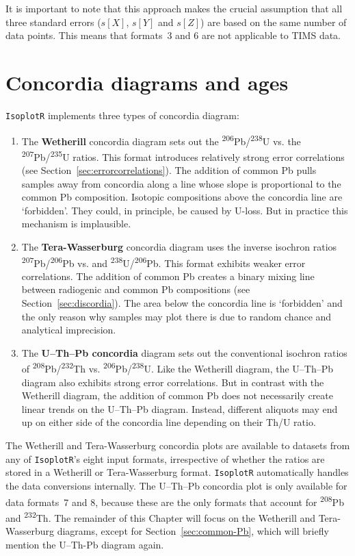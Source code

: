 \begin{refsection}
It is important to note that this approach makes the crucial
assumption that all three standard errors ($s[X]$, $s[Y]$ and $s[Z]$)
are based on the same number of data points. This means that formats~3
and 6 are not applicable to TIMS data.

\section{Concordia diagrams and ages}
\label{sec:concordia}

\texttt{IsoplotR} implements three types of concordia diagram:

\begin{enumerate}
\item The \textbf{Wetherill} concordia diagram sets out the
  \textsuperscript{206}Pb/\textsuperscript{238}U vs. the
  \textsuperscript{207}Pb/\textsuperscript{235}U ratios. This format
  introduces relatively strong error correlations (see
  Section~\ref{sec:errorcorrelations}). The addition of common Pb
  pulls samples away from concordia along a line whose slope is
  proportional to the common Pb composition. Isotopic compositions
  above the concordia line are `forbidden'. They could, in principle,
  be caused by U-loss. But in practice this mechanism is implausible.
\item The \textbf{Tera-Wasserburg} concordia diagram uses the inverse
  isochron ratios \textsuperscript{207}Pb/\textsuperscript{206}Pb vs.
  and \textsuperscript{238}U/\textsuperscript{206}Pb. This format
  exhibits weaker error correlations. The addition of common Pb
  creates a binary mixing line between radiogenic and common Pb
  compositions (see Section~\ref{sec:discordia}). The area below the
  concordia line is `forbidden' and the only reason why samples may
  plot there is due to random chance and analytical imprecision.
\item The \textbf{U--Th--Pb concordia} diagram sets out the
  conventional isochron ratios of
  \textsuperscript{208}Pb/\textsuperscript{232}Th vs.
  \textsuperscript{206}Pb/\textsuperscript{238}U. Like the Wetherill
  diagram, the U--Th--Pb diagram also exhibits strong error
  correlations.  But in contrast with the Wetherill diagram, the
  addition of common Pb does not necessarily create linear trends on
  the U--Th--Pb diagram. Instead, different aliquots may end up on
  either side of the concordia line depending on their Th/U ratio.
\end{enumerate}

The Wetherill and Tera-Wasserburg concordia plots are available to
datasets from any of \texttt{IsoplotR}'s eight input formats,
irrespective of whether the ratios are stored in a Wetherill or
Tera-Wasserburg format. \texttt{IsoplotR} automatically handles the
data conversions internally. The U--Th--Pb concordia plot is only
available for data formats~7 and 8, because these are the only formats
that account for \textsuperscript{208}Pb and \textsuperscript{232}Th.
The remainder of this Chapter will focus on the Wetherill and
Tera-Wasserburg diagrams, except for Section~\ref{sec:common-Pb},
which will briefly mention the U--Th-Pb diagram again.


\end{refsection}
